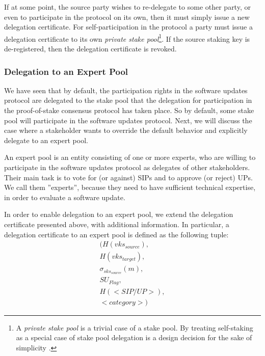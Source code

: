 If at some point, the source party wishes to re-delegate to some other party, or even to participate in the protocol on its own, then it must simply issue a new delegation certificate. For self-participation in the protocol a party must issue a delegation certificate to its own \emph{private stake pool}\footnote{A \emph{private stake pool} is a trivial case of a stake pool. By treating self-staking as a special case of stake pool delegation is a design decision for the sake of simplicity \cite{deldesign}.}. If the source staking key is de-registered, then the delegation certificate is revoked.

\subsubsection*{Delegation to an Expert Pool}
We have seen that by default, the participation rights in the software updates protocol are delegated to the stake pool that the delegation for participation in the proof-of-stake consensus protocol has taken place. So by default, some stake pool will participate in the software updates protocol. Next, we will discuss the case where a stakeholder wants to override the default behavior and explicitly delegate to an expert pool.

An expert pool is an entity consisting of one or more experts, who are willing to participate in the software updates protocol as delegates of other stakeholders. Their main task is to vote for (or against) SIPs and to approve (or reject) UPs. We call them ''experts'', because they need to have sufficient technical expertise, in order to evaluate a software update.

In order to enable delegation to an expert pool, we extend the delegation certificate presented above, with additional information. In particular, a delegation certificate to an expert pool is defined as the following tuple:
\begin{align*}
(H(vks_{source}), \\
 H(vks_{target}), \\
 \sigma_{sks_{source}}(m), \\
 SU_{Flag}, \\
 H(<SIP/UP>), \\
 <category>)
\end{align*}

